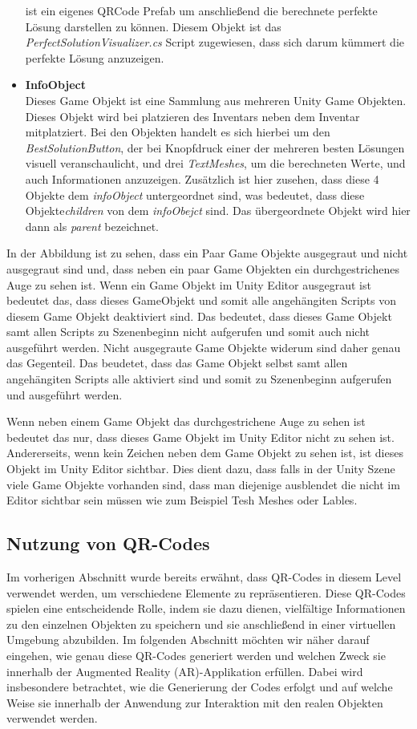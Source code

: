 \begin{itemize}
    ist ein eigenes QRCode Prefab um anschließend die berechnete perfekte Lösung darstellen zu können. Diesem Objekt ist
    das \textit{PerfectSolutionVisualizer.cs} Script zugewiesen, dass sich darum kümmert die perfekte Lösung anzuzeigen.
    \item \textbf{InfoObject}\\
    Dieses Game Objekt ist eine Sammlung aus mehreren Unity Game Objekten. Dieses Objekt wird bei platzieren
    des Inventars neben dem Inventar mitplatziert. Bei den Objekten handelt es sich hierbei um den \textit{BestSolutionButton},
    der bei Knopfdruck einer der mehreren besten Lösungen visuell veranschaulicht, und drei \textit{TextMeshes}, um die
    berechneten Werte, und auch Informationen anzuzeigen. Zusätzlich ist hier zusehen, dass diese 4 Objekte dem \textit{infoObject}
    untergeordnet sind, was bedeutet, dass diese Objekte\textit{children} von dem \textit{infoObejct} sind. Das übergeordnete
    Objekt wird hier dann als \textit{parent} bezeichnet.
\end{itemize}

In der Abbildung ist zu sehen, dass ein Paar Game Objekte ausgegraut und nicht ausgegraut sind und, dass neben ein paar Game Objekten ein durchgestrichenes Auge zu sehen ist.
Wenn ein Game Objekt im Unity Editor ausgegraut ist bedeutet das, dass dieses GameObjekt und somit alle angehängiten Scripts von diesem Game Objekt deaktiviert sind.
Das bedeutet, dass dieses Game Objekt samt allen Scripts zu Szenenbeginn nicht aufgerufen und somit auch nicht ausgeführt werden. Nicht ausgegraute Game Objekte widerum sind
daher genau das Gegenteil. Das beudetet, dass das Game Objekt selbst samt allen angehängiten Scripts alle aktiviert sind und somit zu Szenenbeginn aufgerufen und ausgeführt werden.

Wenn neben einem Game Objekt das durchgestrichene Auge zu sehen ist bedeutet das nur, dass dieses Game Objekt im Unity Editor nicht zu sehen ist. Andererseits, wenn kein Zeichen
neben dem Game Objekt zu sehen ist, ist dieses Objekt im Unity Editor sichtbar. Dies dient dazu, dass falls in der Unity Szene viele Game Objekte vorhanden sind, dass man
diejenige ausblendet die nicht im Editor sichtbar sein müssen wie zum Beispiel Tesh Meshes oder Lables.

\subsection{Nutzung von QR-Codes}
Im vorherigen Abschnitt wurde bereits erwähnt, dass QR-Codes in diesem Level verwendet werden, um verschiedene Elemente
zu repräsentieren. Diese QR-Codes spielen eine entscheidende Rolle, indem sie dazu dienen, vielfältige Informationen zu
den einzelnen Objekten zu speichern und sie anschließend in einer virtuellen Umgebung abzubilden. Im folgenden Abschnitt
möchten wir näher darauf eingehen, wie genau diese QR-Codes generiert werden und welchen Zweck sie innerhalb der
Augmented Reality (AR)-Applikation erfüllen. Dabei wird insbesondere betrachtet, wie die Generierung der Codes erfolgt
und auf welche Weise sie innerhalb der Anwendung zur Interaktion mit den realen Objekten verwendet werden.

